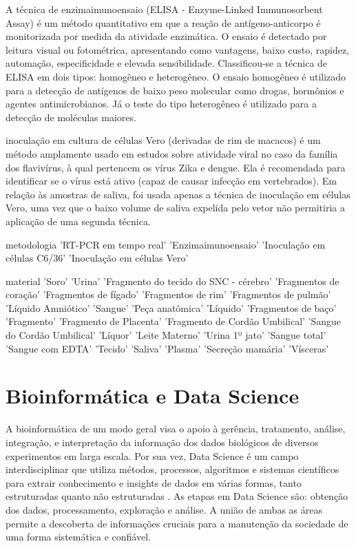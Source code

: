 A técnica de enzimaimunoensaio (ELISA - Enzyme-Linked Immunosorbent Assay) é um método quantitativo em que a reação de antígeno-anticorpo é monitorizada por medida da atividade enzimática. O ensaio é detectado por leitura visual ou fotométrica, apresentando como vantagens, baixo custo, rapidez, automação, especificidade e elevada sensibilidade. Classificou-se a técnica de ELISA em dois tipos: homogêneo e heterogêneo. O ensaio homogêneo é utilizado para a detecção de antígenos de baixo peso molecular como drogas, hormônios e agentes antimicrobianos. Já o teste do tipo heterogêneo é utilizado para a detecção de moléculas maiores.

inoculação em cultura de células Vero (derivadas de rim de macacos) é um método amplamente usado em estudos sobre atividade viral no caso da família dos flavivírus, à qual pertencem os vírus Zika e dengue. Ela é recomendada para identificar se o vírus está ativo (capaz de causar infecção em vertebrados). Em relação às amostras de saliva, foi usada apenas a técnica de inoculação em células Vero, uma vez que o baixo volume de saliva expelida pelo vetor não permitiria a aplicação de uma segunda técnica.

metodologia
'RT-PCR em tempo real'
'Enzimaimunoensaio'
'Inoculação em células C6/36'
'Inoculação em células Vero'


material
'Soro'
'Urina'
'Fragmento do tecido do SNC - cérebro'
'Fragmentos de coração'
'Fragmentos de fígado'
'Fragmentos de rim'
'Fragmentos de pulmão'
'Líquido Amniótico'
'Sangue'
'Peça anatômica'
'Líquido'
'Fragmentos de baço'
'Fragmento'
'Fragmento de Placenta'
'Fragmento de Cordão Umbilical'
'Sangue do Cordão Umbilical'
'Líquor'
'Leite Materno'
'Urina 1º jato'
'Sangue total'
'Sangue com EDTA'
'Tecido'
'Saliva'
'Plasma'
'Secreção mamária'
'Vísceras'

\section{Bioinformática e Data Science}

A bioinformática de um modo geral visa o apoio à gerência, tratamento, análise, integração, e interpretação da informação dos dados biológicos de diversos experimentos em larga escala. Por sua vez, Data Science é um campo interdisciplinar que utiliza métodos, processos, algoritmos e sistemas científicos para extrair conhecimento e insights de dados em várias formas, tanto estruturadas quanto não estruturadas \cite{dhar2013data}. As etapas em Data Science são: obtenção dos dados, processamento, exploração e análise. A união de ambas as áreas permite a descoberta de informações cruciais para a manutenção da sociedade de uma forma sistemática e confiável.

